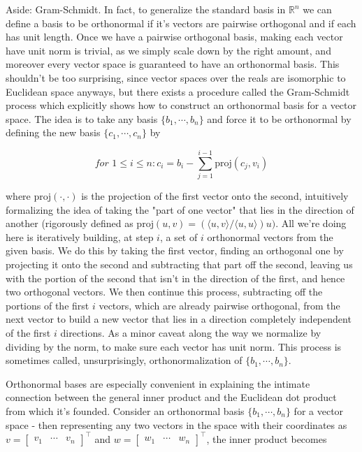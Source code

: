 \documentclass{article}
\newcommand{\n}{\leavevmode \newline}
\newcommand{\R}{\mathbb{R}}
\begin{document}
\n
\begin{adjustwidth}{1cm}{1cm}

	Aside: Gram-Schmidt. In fact, to generalize the standard basis in $ \R^n $ we can define a basis to be orthonormal if it's vectors are pairwise orthogonal and if each has unit length. Once we have a pairwise orthogonal basis, making each vector have unit norm is trivial, as we simply scale down by the right amount, and moreover every vector space is guaranteed to have an orthonormal basis. This shouldn't be too surprising, since vector spaces over the reals are isomorphic to Euclidean space anyways, but there exists a procedure called the Gram-Schmidt process which explicitly shows how to construct an orthonormal basis for a vector space. The idea is to take any basis $ \{ b_1, \cdots, b_n \} $ and force it to be orthonormal by defining the new basis $ \{ c_1, \cdots, c_n \} $ by

        $$ \textit{for } 1 \leq i \leq n: c_i = b_i - \sum_{j = 1}^{i - 1} \text{proj}(c_j, v_i) $$

    where $ \text{proj}(\cdot, \cdot) $ is the projection of the first vector onto the second, intuitively formalizing the idea of taking the "part of one vector" that lies in the direction of another (rigorously defined as $ \text{proj}(u, v) = (\langle u, v \rangle / \langle u, u \rangle) u) $. All we're doing here is iteratively building, at step $ i $, a set of $ i $ orthonormal vectors from the given basis. We do this by taking the first vector, finding an orthogonal one by projecting it onto the second and subtracting that part off the second, leaving us with the portion of the second that isn't in the direction of the first, and hence two orthogonal vectors. We then continue this process, subtracting off the portions of the first $ i $ vectors, which are already pairwise orthogonal, from the next vector to build a new vector that lies in a direction completely independent of the first $ i $ directions. As a minor caveat along the way we normalize by dividing by the norm, to make sure each vector has unit norm. This process is sometimes called, unsurprisingly, orthonormalization of $ \{ b_1, \cdots, b_n \} $.

\end{adjustwidth}
\n
Orthonormal bases are especially convenient in explaining the intimate connection between the general inner product and the Euclidean dot product from which it's founded. Consider an orthonormal basis $ \{ b_1, \cdots, b_n \} $ for a vector space - then representing any two vectors in the space with their coordinates as $ v = \begin{bmatrix} v_1 & \cdots & v_n \end{bmatrix}^\intercal $ and $ w = \begin{bmatrix} w_1 & \cdots & w_n \end{bmatrix}^\intercal $, the inner product becomes
\end{document}
